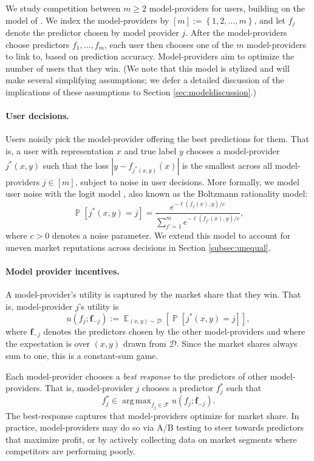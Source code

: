 \documentclass[letterpaper,11pt]{article}
\theoremstyle{plain}
\DeclareMathOperator*{\argmax}{arg\,max}
\DeclareMathOperator*{\E}{\mathbb{E}}
\DeclareMathOperator*{\Prob}{\mathbb{P}}
\begin{document}
We study competition between $m \ge 2$ model-providers for users, building on the model of \citet{BT17, BT19}. We index the model-providers by $[m] := \left\{1, 2, \ldots, m\right\}$, and let $f_j$ denote the predictor chosen by model provider $j$. After the model-providers choose predictors $f_1, \ldots, f_m$, each user then chooses one of the $m$ model-providers to link to, based on prediction accuracy. Model-providers aim to optimize the number of users that they win. (We note that this model is stylized and will make several simplifying assumptions; we defer a detailed discussion of the implications of these assumptions to Section \ref{sec:modeldiscussion}.) 


\paragraph{User decisions.} Users noisily pick the model-provider offering the best predictions for them. That is, a user with representation $x$ and true label $y$ chooses a model-provider $j^*(x,y)$ such that the loss $|y - f_{j^*(x,y)}(x)|$ is the smallest across all model-providers $j \in [m]$, subject to noise in user decisions. More formally, we model user noise with the logit model \citep{train2002discrete}, also known as the Boltzmann rationality model:
\begin{equation}
\label{eq:userchoice}
\Prob[j^*(x,y) = j] = \frac{e^{- \ell(f_j(x), y) / c}}{\sum_{j'=1}^m e^{- \ell(f_{j'}(x), y) / c}}, 
\end{equation}
where $c > 0$ denotes a noise parameter. We extend this model to account for uneven market reputations across decisions in Section \ref{subsec:unequal}.


\paragraph{Model provider incentives.} A model-provider's utility is captured by the market share that they win. That is, model-provider $j$'s utility is 
\[u(f_j; \mathbf{f}_{-j}) := \E_{(x,y) \sim \mathcal{D}} \left[\Prob[j^*(x,y) = j] \right],\]
where $\textbf{f}_{-j}$ denotes the predictors chosen by the other model-providers and where the expectation is over $(x,y)$ drawn from $\mathcal{D}$. Since the market shares always sum to one, this is a constant-sum game. 


Each model-provider chooses a \textit{best response} to the predictors of other model-providers. That is, model-provider $j$ chooses a predictor $f^*_j$ such that 
\[f^*_j \in \argmax_{f_j \in \mathcal{F}} u(f_j; \mathbf{f}_{-j}). \] The best-response captures that model-providers optimize for market share. In practice, model-providers may do so via {A/B testing} to steer towards predictors that maximize profit, or by {actively collecting data} on market segments where competitors are performing poorly.
\end{document}
